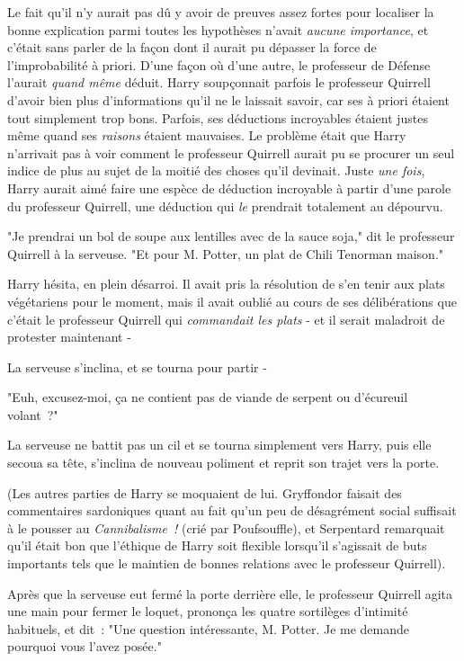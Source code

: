 Le fait qu'il n'y aurait pas dû y avoir de preuves assez fortes pour localiser la bonne explication parmi toutes les hypothèses n'avait \emph{aucune importance}, et c'était sans parler de la façon dont il aurait pu dépasser la force de l'improbabilité à priori. D'une façon où d'une autre, le professeur de Défense l'aurait \emph{quand même} déduit. Harry soupçonnait parfois le professeur Quirrell d'avoir bien plus d'informations qu'il ne le laissait savoir, car ses à priori étaient tout simplement trop bons. Parfois, ses déductions incroyables étaient justes même quand ses \emph{raisons} étaient mauvaises. Le problème était que Harry n'arrivait pas à voir comment le professeur Quirrell aurait pu se procurer un seul indice de plus au sujet de la moitié des choses qu'il devinait. Juste \emph{une fois}, Harry aurait aimé faire une espèce de déduction incroyable à partir d'une parole du professeur Quirrell, une déduction qui \emph{le} prendrait totalement au dépourvu.

\later

"Je prendrai un bol de soupe aux lentilles avec de la sauce soja," dit le professeur Quirrell à la serveuse. "Et pour M. Potter, un plat de Chili Tenorman maison."

Harry hésita, en plein désarroi. Il avait pris la résolution de s'en tenir aux plats végétariens pour le moment, mais il avait oublié au cours de ses délibérations que c'était le professeur Quirrell qui \emph{commandait les plats} - et il serait maladroit de protester maintenant -

La serveuse s'inclina, et se tourna pour partir -

"Euh, excusez-moi, ça ne contient pas de viande de serpent ou d'écureuil volant~?"

La serveuse ne battit pas un cil et se tourna simplement vers Harry, puis elle secoua sa tête, s'inclina de nouveau poliment et reprit son trajet vers la porte.

(Les autres parties de Harry se moquaient de lui. Gryffondor faisait des commentaires sardoniques quant au fait qu'un peu de désagrément social suffisait à le pousser au \emph{Cannibalisme~!} (crié par Poufsouffle), et Serpentard remarquait qu'il était bon que l'éthique de Harry soit flexible lorsqu'il s'agissait de buts importants tels que le maintien de bonnes relations avec le professeur Quirrell).

Après que la serveuse eut fermé la porte derrière elle, le professeur Quirrell agita une main pour fermer le loquet, prononça les quatre sortilèges d'intimité habituels, et dit~: "Une question intéressante, M. Potter. Je me demande pourquoi vous l'avez posée."


